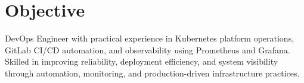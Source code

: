 \documentclass[../main.tex]{subfiles}
\begin{document}
\section{Objective}
\begin{category}
  \citembullet
  DevOps Engineer with practical experience in Kubernetes platform operations, GitLab CI/CD automation,
  and observability using Prometheus and Grafana. Skilled in improving reliability,
  deployment efficiency, and system visibility through automation, monitoring, and production-driven infrastructure practices.
\end{category}
\end{document}
